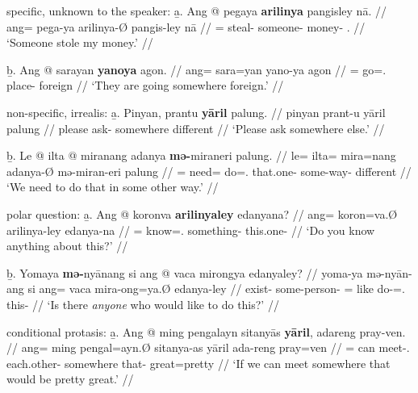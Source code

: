 \a specific, unknown to the speaker:\vspace{.5em} %
	\beginsubsub
	\b{a.} \begingl
		\gla Ang @ pegaya \textbf{arilinya} pangisley nā. //
		\glb ang= pega-ya arilinya-Ø pangis-ley nā //
		\glc \AgtT{}= steal-\TsgM{} someone-\Top{} money-\PargI{} 
			\Fsg{}.\Gen{} //
		\glft `Someone stole my money.' //
		\endgl\vspace{.5em}
		
	\b{b.} \begingl
		\gla Ang @ sarayan \textbf{yanoya} agon. //
		\glb ang= sara=yan yano-ya agon //
		\glc \AgtT{}= go=\TplM{}.\Top{} place-\Loc{} foreign //
		\glft `They are going somewhere foreign.' //
		\endgl
	\endsubsub

\a non-specific, irrealis:\vspace{.5em} %
	\beginsubsub
	\b{a.} \begingl
		\gla Pinyan, prantu \textbf{yāril} palung. //
		\glb pinyan prant-u yāril palung //
		\glc please ask-\Imp{} somewhere different //
		\glft `Please ask somewhere else.' //
		\endgl\vspace{.5em}
		
	\b{b.} \begingl
		\gla Le @ ilta @ miranang adanya \textbf{mə-}miraneri 
			palung. //
		\glb le= ilta= mira=nang adanya-Ø mə-miran-eri palung //
		\glc \PatTI{}= need= do=\Fsg{}.\Aarg{} that.one-\Top{} 
			some-way-\Ins{} different //
		\glft `We need to do that in some other way.' //
		\endgl
	\endsubsub

\a polar question:\vspace{.5em} %
	\beginsubsub
	\b{a.} \begingl
		\gla Ang @ koronva \textbf{arilinyaley} edanyana? //
		\glb ang= koron=va.Ø arilinya-ley edanya-na //
		\glc \AgtT{}= know=\Second{}.\Top{} something-\PargI{} 
			this.one-\Gen{} //
		\glft `Do you know anything about this?' //
		\endgl\vspace{.5em}
		
	\b{b.} \begingl
		\gla Yomaya \textbf{mə-}nyānang si ang @ vaca mirongya 
			edanyaley? //
		\glb yoma-ya mə-nyān-ang si ang= vaca mira-ong=ya.Ø
			edanya-ley //
		\glc exist-\TsgM{} some-person-\Aarg{} \Rel{} \AgtT{}= 
			like do-\Irr{}=\TsgM{}.\Top{} this-\PargI{} //
		\glft `Is there \emph{anyone} who would like to do this?' //
		\endgl
	\endsubsub

\a conditional protasis:\vspace{.5em} %
	\beginsubsub
	\b{a.} \begingl
		\gla Ang @ ming pengalayn sitanyās \textbf{yāril}, adareng 
			pray-ven. //
		\glb ang= ming pengal=ayn.Ø sitanya-as yāril ada-reng 
			pray=ven //
		\glc \AgtT{}= can meet-\Fpl{}.\Top{} each.other-\Parg{} 
			somewhere that-\AargI{} great=pretty //
		\glft `If we can meet somewhere that would be pretty great.' //
		\endgl\vspace{.5em}
		

